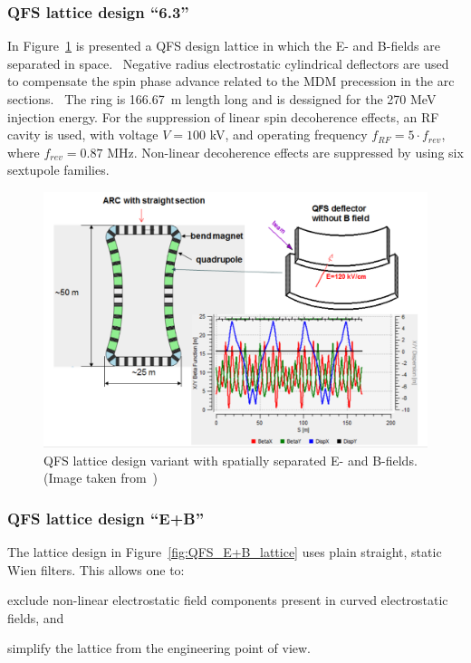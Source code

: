 \subsubsection{QFS lattice design ``6.3''}\label{chpt2:lattice:QFS:6_3}

In Figure~\ref{fig:QFS_6_3_lattice} is presented a QFS design lattice in which the E- and B-fields are
separated in space.~\cite{Senichev:Lattices} Negative radius electrostatic cylindrical deflectors are used
to compensate the spin phase advance related to the MDM precession in the arc sections.~\cite{Senichev:QFS_IPAC15}
The ring is 166.67~m length long and is dessigned for the 270 MeV injection energy. For the suppression
of linear spin decoherence effects, an RF cavity is used, with voltage $V = 100$ kV, and operating
frequency $f_{RF} = 5\cdot f_{rev}$, where $f_{rev} = 0.87$ MHz. Non-linear decoherence effects are suppressed
by using six sextupole families.

\begin{figure}[h!]
	\centering
	\includegraphics[width=\linewidth]{images/chapter2/6_3_lattice}
	\caption{QFS lattice design variant with spatially separated E- and B-fields.
          (Image taken from~\cite{Senichev:Lattices})\label{fig:QFS_6_3_lattice}}
\end{figure}

\subsubsection{QFS lattice design ``E+B''}\label{chpt2:lattice:QFS:EB}

The lattice design in Figure~\ref{fig:QFS_E+B_lattice} uses plain straight, static Wien filters.
This allows one to:
\begin{enumerate*}
	\item exclude non-linear electrostatic field components present in curved electrostatic fields, and 
	\item simplify the lattice from the engineering point of view.
\end{enumerate*}

